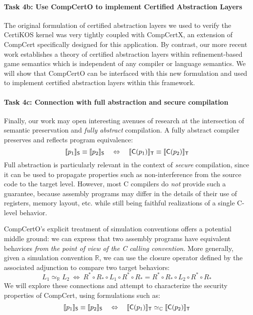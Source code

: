 \vspace*{-2ex}
\paragraph*{Task 4b: Use CompCertO to implement Certified Abstraction Layers}

The original formulation of certified abstraction layers
we used to verify the CertiKOS kernel \cite{popl15}
was very tightly coupled with CompCertX,
an extension of CompCert specifically designed for this application.
By contrast,
our more recent work establishes a theory of certified abstraction layers
within refinement-based game semantics
which is independent of any compiler
or language semantics.
We will show that CompCertO can be interfaced with this new formulation
and used to implement certified abstraction layers within this framework.

\vspace*{-2ex}
\paragraph*{Task 4c: Connection with full abstraction and secure compilation} 
Finally,
our work may open interesting avenues of research
at the intersection of
semantic preservation and \emph{fully abstract} compilation.
A fully abstract compiler preserves and reflects program equivalence:
\begin{equation} \label{eqn:fac}
  \llbracket p_1 \rrbracket_{ \mathsf{S} } \equiv
  \llbracket p_2 \rrbracket_{ \mathsf{S} }
  \quad \Leftrightarrow \quad
  \llbracket  \mathsf{C} (p_1) \rrbracket_{ \mathsf{T} } \equiv
  \llbracket  \mathsf{C} (p_2) \rrbracket_{ \mathsf{T} }
\end{equation}
Full abstraction is particularly relevant
in the context of \emph{secure} compilation,
since it can be used to propagate properties such as non-interference
from the source code to the target level.
However,
most C compilers do \emph{not} provide such a guarantee,
because assembly programs may differ in the details
of their use of registers, memory layout, etc.
while still being faithful realizations of a single C-level behavior.

CompCertO's explicit treatment of simulation conventions
offers a potential middle ground:
we can express that two assembly programs
have equivalent behaviors
\emph{from the point of view of the C calling convention}.
More generally,
given a simulation convention $\mathbb{R}$,
we can use the closure operator defined by the associated adjunction
to compare two target behaviors:
\[
  L_1 \simeq_\mathbb{R} L_2 \: \Leftrightarrow \:
  R^* \circ R_* \circ L_1 \circ R^* \circ R_* =
  R^* \circ R_* \circ L_2 \circ R^* \circ R_*
\]
We will explore these connections and attempt to characterize
the security properties of CompCert,
using formulations such as:
\[
  \llbracket p_1 \rrbracket_{ \mathsf{S} } \equiv
  \llbracket p_2 \rrbracket_{ \mathsf{S} }
  \quad \Leftrightarrow \quad
  \llbracket  \mathsf{C} (p_1) \rrbracket_{ \mathsf{T} } \simeq_\mathbb{C}
  \llbracket  \mathsf{C} (p_2) \rrbracket_{ \mathsf{T} }
\]

